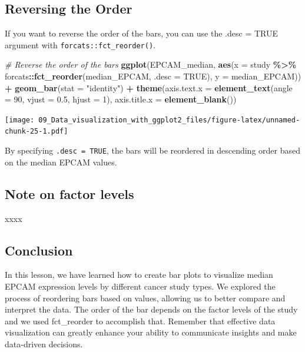 \documentclass[
]{book}
\newenvironment{Shaded}{\begin{snugshade}}{\end{snugshade}}
\newcommand{\AttributeTok}[1]{\textcolor[rgb]{0.13,0.29,0.53}{#1}}
\newcommand{\CommentTok}[1]{\textcolor[rgb]{0.56,0.35,0.01}{\textit{#1}}}
\newcommand{\ConstantTok}[1]{\textcolor[rgb]{0.56,0.35,0.01}{#1}}
\newcommand{\DecValTok}[1]{\textcolor[rgb]{0.00,0.00,0.81}{#1}}
\newcommand{\FloatTok}[1]{\textcolor[rgb]{0.00,0.00,0.81}{#1}}
\newcommand{\FunctionTok}[1]{\textcolor[rgb]{0.13,0.29,0.53}{\textbf{#1}}}
\newcommand{\NormalTok}[1]{#1}
\newcommand{\SpecialCharTok}[1]{\textcolor[rgb]{0.81,0.36,0.00}{\textbf{#1}}}
\newcommand{\StringTok}[1]{\textcolor[rgb]{0.31,0.60,0.02}{#1}}
\begin{document}
\hypertarget{reversing-the-order}{%
\subsection{Reversing the Order}\label{reversing-the-order}}

If you want to reverse the order of the bars, you can use the .desc = TRUE argument with \texttt{forcats::fct\_reorder()}.

\begin{Shaded}
\begin{Highlighting}[]
\CommentTok{\# Reverse the order of the bars}
\FunctionTok{ggplot}\NormalTok{(EPCAM\_median, }\FunctionTok{aes}\NormalTok{(}\AttributeTok{x =}\NormalTok{ study }\SpecialCharTok{\%\textgreater{}\%}
\NormalTok{                           forcats}\SpecialCharTok{::}\FunctionTok{fct\_reorder}\NormalTok{(median\_EPCAM, }\AttributeTok{.desc =} \ConstantTok{TRUE}\NormalTok{), }
                         \AttributeTok{y =}\NormalTok{ median\_EPCAM)) }\SpecialCharTok{+}
  \FunctionTok{geom\_bar}\NormalTok{(}\AttributeTok{stat =} \StringTok{"identity"}\NormalTok{) }\SpecialCharTok{+}
  \FunctionTok{theme}\NormalTok{(}\AttributeTok{axis.text.x =} \FunctionTok{element\_text}\NormalTok{(}\AttributeTok{angle =} \DecValTok{90}\NormalTok{, }\AttributeTok{vjust =} \FloatTok{0.5}\NormalTok{, }\AttributeTok{hjust =} \DecValTok{1}\NormalTok{),}
        \AttributeTok{axis.title.x =} \FunctionTok{element\_blank}\NormalTok{())}
\end{Highlighting}
\end{Shaded}

\texttt{[image: 09\_Data\_visualization\_with\_ggplot2\_files/figure-latex/unnamed-chunk-25-1.pdf]}

By specifying \texttt{.desc\ =\ TRUE}, the bars will be reordered in descending order based on the median EPCAM values.

\hypertarget{note-on-factor-levels}{%
\subsection{Note on factor levels}\label{note-on-factor-levels}}

xxxx

\hypertarget{conclusion-25}{%
\subsection{Conclusion}\label{conclusion-25}}

In this lesson, we have learned how to create bar plots to visualize median EPCAM expression levels by different cancer study types. We explored the process of reordering bars based on values, allowing us to better compare and interpret the data. The order of the bar depends on the factor levels of the study and we used fct\_reorder to accomplish that. Remember that effective data visualization can greatly enhance your ability to communicate insights and make data-driven decisions.
\end{document}
